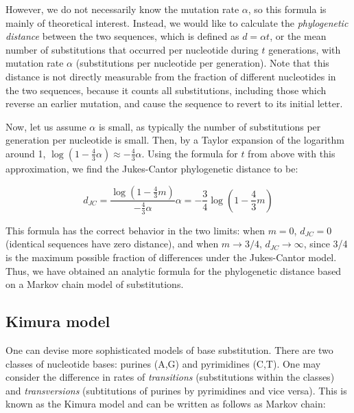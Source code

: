 \documentclass[
  letterpaper,
  DIV=11,
  numbers=noendperiod]{scrreprt}
\begin{document}
However, we do not necessarily know the mutation rate \(\alpha\), so
this formula is mainly of theoretical interest. Instead, we would like
to calculate the \emph{phylogenetic distance} between the two sequences,
which is defined as \(d = \alpha t\), or the mean number of
substitutions that occurred per nucleotide during \(t\) generations,
with mutation rate \(\alpha\) (substitutions per nucleotide per
generation). Note that this distance is not directly measurable from the
fraction of different nucleotides in the two sequences, because it
counts all substitutions, including those which reverse an earlier
mutation, and cause the sequence to revert to its initial letter.

Now, let us assume \(\alpha\) is small, as typically the number of
substitutions per generation per nucleotide is small. Then, by a Taylor
expansion of the logarithm around 1,
\(\log (1 -\frac{4}{3} \alpha) \approx - \frac{4}{3}\alpha\). Using the
formula for \(t\) from above with this approximation, we find the
Jukes-Cantor phylogenetic distance to be:

\[ 
d_{JC} = \frac{\log (1 - \frac{4}{3}m)}{ - \frac{4}{3} \alpha} \alpha =  -\frac{3}{4}\log (1 - \frac{4}{3} m)
\]

This formula has the correct behavior in the two limits: when \(m = 0\),
\(d_{JC} = 0\) (identical sequences have zero distance), and when
\(m \rightarrow 3/4\), \(d_{JC} \rightarrow \infty\), since 3/4 is the
maximum possible fraction of differences under the Jukes-Cantor model.
Thus, we have obtained an analytic formula for the phylogenetic distance
based on a Markov chain model of substitutions.

\subsection{Kimura model}\label{kimura-model}

One can devise more sophisticated models of base substitution. There are
two classes of nucleotide bases: purines (A,G) and pyrimidines (C,T).
One may consider the difference in rates of \emph{transitions}
(substitutions within the classes) and \emph{transversions}
(subtitutions of purines by pyrimidines and vice versa). This is known
as the Kimura model and can be written as follows as Markov chain:
\end{document}
